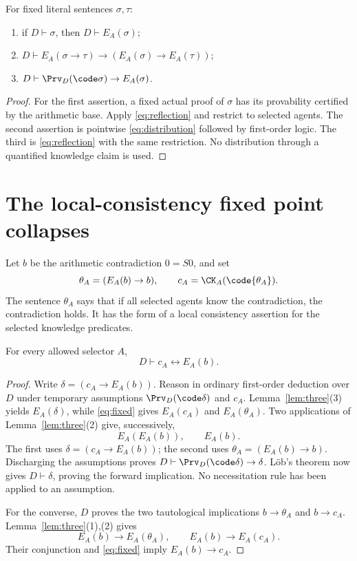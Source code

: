 \documentclass[11pt]{article}
\begin{document}
\begin{lemma}\label{lem:three}
For fixed literal sentences $\sigma,\tau$:
\begin{enumerate}
\item if $D\vdash\sigma$, then $D\vdash E_A(\sigma)$;
\item $D\vdash E_A(\sigma\to\tau)\to(E_A(\sigma)\to E_A(\tau))$;
\item $D\vdash\Prv_D(\code\sigma)\to E_A(\sigma)$.
\end{enumerate}
\end{lemma}
\begin{proof}
For the first assertion, a fixed actual proof of $\sigma$ has its
provability certified by the arithmetic base. Apply
\eqref{eq:reflection} and restrict to selected agents. The second
assertion is pointwise \eqref{eq:distribution} followed by first-order
logic. The third is \eqref{eq:reflection} with the same restriction.
No distribution through a quantified knowledge claim is used.
\end{proof}

\section{The local-consistency fixed point collapses}

Let $b$ be the arithmetic contradiction $0=S0$, and set
\[
 \theta_A=(E_A(b)\to b),\qquad c_A=\CK_A(\code{\theta_A}).
\]
The sentence $\theta_A$ says that if all selected agents know the
contradiction, the contradiction holds. It has the form of a local
consistency assertion for the selected knowledge predicates.

\begin{theorem}\label{thm:collapse}
For every allowed selector $A$,
\[
 D\vdash c_A\leftrightarrow E_A(b).
\]
\end{theorem}
\begin{proof}
Write $\delta=(c_A\to E_A(b))$. Reason in ordinary first-order
deduction over $D$ under temporary assumptions
$\Prv_D(\code\delta)$ and $c_A$. Lemma~\ref{lem:three}(3) yields
$E_A(\delta)$, while \eqref{eq:fixed} gives
$E_A(c_A)$ and $E_A(\theta_A)$. Two applications of
Lemma~\ref{lem:three}(2) give, successively,
\[
 E_A(E_A(b)),\qquad E_A(b).
\]
The first uses $\delta=(c_A\to E_A(b))$; the second uses
$\theta_A=(E_A(b)\to b)$. Discharging the assumptions proves
$D\vdash\Prv_D(\code\delta)\to\delta$. L\"ob's theorem now gives
$D\vdash\delta$, proving the forward implication. No necessitation
rule has been applied to an assumption.

For the converse, $D$ proves the two tautological implications
$b\to\theta_A$ and $b\to c_A$. Lemma~\ref{lem:three}(1),(2) gives
\[
 E_A(b)\to E_A(\theta_A),\qquad E_A(b)\to E_A(c_A).
\]
Their conjunction and \eqref{eq:fixed} imply $E_A(b)\to c_A$.
\end{proof}
\end{document}
